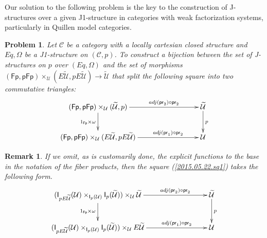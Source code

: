 \documentclass[12pt]{article}
\numberwithin{equation}{section}
\newenvironment{eq}{\begin{equation}}{\end{equation}}
\newtheorem{remark}[proposition]{Remark}
\newtheorem{problem}[proposition]{Problem}
\newcommand{\sr}{\rightarrow}
\newcommand{\wt}{\widetilde}
\newcommand{\C}{{\mathcal C}}  %
\newcommand{\id}{1}            %
\newcommand{\U}{\mathcal{U}}
\newcommand{\I}{\mathsf{I}}
\newcommand{\Fp}{\mathsf{Fp}}
\newcommand{\pFp}{\mathsf{pFp}}
\newcommand{\pr}{\mathsf{pr}}
\begin{document}
Our solution to the following problem is the key to the construction of
J-structures over a given J1-structure in categories with weak factorization
systems, particularly in Quillen model categories.
%
\begin{problem}
\label{2015.05.12.l1} Let $\C$ be a category with a locally cartesian
closed structure and $Eq,\Omega$ be a J1-structure on $({\C},p)$. To
construct a bijection between the set of J-structures on $p$ over $(Eq,\Omega)$
and the set of morphisms $(\Fp,\pFp)\times_\U(E\wt{\U},pE\wt{\U})\sr \wt{\U}$ that
split the following square into two commutative triangles:
%
\begin{eq}\label{2015.05.22.sq1}
\begin{xy}
          \xymatrix@C=7pc{ (\Fp,\pFp)\times_\U(\wt{\U},p) \ar[r]^-{adj(\pr_2)\circ
              \pr_2} \ar[d]_{\id_{\Fp}\times \omega} & \wt{\U}
            \ar[d]^{p}\\ (\Fp,\pFp)\times_\U(E\wt{\U},pE\wt{\U})
            \ar[r]^-{adj(\pr_1)\circ \pr_2} & \U }
\end{xy}
\end{eq}%
%
\end{problem}
%
\begin{remark}\rm
If we omit, as is customarily done, the explicit functions to the base in the
notation of the fiber products, then the square (\ref{2015.05.22.sq1}) takes the
following form.
%
\begin{eq}\label{2017.08.16.sq1}
\begin{xy}
          \xymatrix@C=7pc{ (\I_{pE\wt{\U}}(\U)\times_{\I_p(\U)}
            \I_p(\wt{\U}))\times_\U\wt{\U} \ar[r]^-{adj(\pr_2)\circ \pr_2}
            \ar[d]_{\id_{\Fp}\times \omega} & \wt{\U}
            \ar[d]^{p}\\ (\I_{pE\wt{\U}}(\U)\times_{\I_p(\U)} \I_p(\wt{\U}))\times_\U
            E\wt{\U} \ar[r]^-{adj(\pr_1)\circ \pr_2} & \U }
\end{xy}
\end{eq}%




\end{remark}
%
\end{document}
